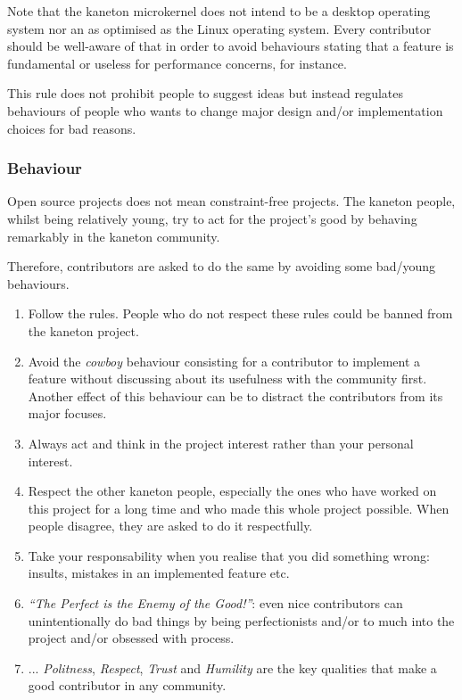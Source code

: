 Note that the kaneton microkernel does not intend to be a desktop operating
system nor an as optimised as the Linux operating system. Every contributor
should be well-aware of that in order to avoid behaviours stating that a
feature is fundamental or useless for performance concerns, for instance.

This rule does not prohibit people to suggest ideas but instead regulates
behaviours of people who wants to change major design and/or implementation
choices for bad reasons.


\subsubsection{Behaviour}

Open source projects does not mean constraint-free projects. The kaneton
people, whilst being relatively young, try to act for the project's good
by behaving remarkably in the kaneton community.

Therefore, contributors are asked to do the same by avoiding some bad/young
behaviours.

\begin{enumerate}
  \item
    Follow the rules. People who do not respect these rules could be banned
    from the kaneton project.
  \item
    Avoid the \textit{cowboy} behaviour consisting for a contributor to
    implement a feature without discussing about its usefulness with the
    community first. Another effect of this behaviour can be to distract
    the contributors from its major focuses.
  \item
    Always act and think in the project interest rather than your personal
    interest.
  \item
    Respect the other kaneton people, especially the ones who have worked
    on this project for a long time and who made this whole project possible.
    When people disagree, they are asked to do it respectfully.
  \item
    Take your responsability when you realise that you did something wrong:
    insults, mistakes in an implemented feature etc.
  \item
    \textit{``The Perfect is the Enemy of the Good!''}: even nice
    contributors can unintentionally do bad things by being perfectionists
    and/or to much into the project and/or obsessed with process.
  \item
    ... \textit{Politness}, \textit{Respect}, \textit{Trust} and
    \textit{Humility} are the key qualities that make a good contributor in
    any community.
\end{enumerate}


